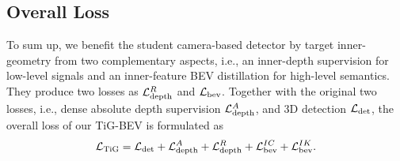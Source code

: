\subsection{Overall Loss}
\label{sec:overall_loss}
To sum up, we benefit the student camera-based detector by target inner-geometry from two complementary aspects, i.e., an inner-depth supervision for low-level signals and an inner-feature BEV distillation for high-level semantics. They produce two losses as $\mathcal{L}^R_{\rm{depth}}$ and $\mathcal{L}_{\rm{bev}}$. Together with the original two losses, i.e., dense absolute depth supervision $\mathcal{L}^A_{\rm{depth}}$, and 3D detection $\mathcal{L}_{\rm{det}}$, the overall loss of our TiG-BEV is formulated as
\begin{equation}
    \mathcal{L}_{\rm{TiG}}=
    \mathcal{L}_{\rm{det}}+
    \mathcal{L}^A_{\rm{depth}}+
    \mathcal{L}^R_{\rm{depth}}+
    \mathcal{L}^{IC}_{\rm{bev}}+
    \mathcal{L}^{IK}_{\rm{bev}}.
    \label{eq:seg}
\end{equation}




